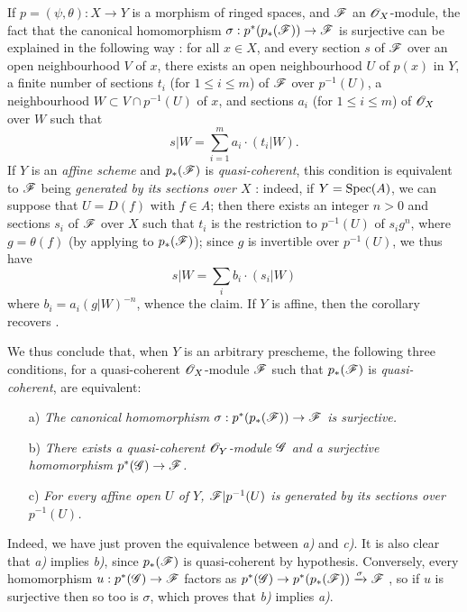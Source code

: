 \begin{remarks}[3.4.7]
\label{II.3.4.7}
If $p=(\psi,\theta):X\to Y$ is a morphism of ringed spaces, and $\mathscr{F}$ an $\mathscr{O}_X$-module, the fact that the canonical homomorphism $\sigma:p^*(p_*(\sh{F}))\to\sh{F}$ is surjective can be explained in the following way : for all $x\in X$, and every section $s$ of $\mathscr{F}$ over an open neighbourhood $V$ of $x$, there exists an open neighbourhood $U$ of $p(x)$ in $Y$, a finite number of sections $t_i$ (for $1\leq i\leq m$) of $\mathscr{F}$ over $p^{-1}(U)$, a neighbourhood $W\subset V\cap p^{-1}(U)$ of $x$, and sections $a_i$ (for $1\leq i\leq m$) of $\mathscr{O}_X$ over $W$ such that
\[
  s|W = \sum_{i=1}^m a_i\cdot(t_i|W).
\]
If $Y$ is an \emph{affine scheme} and $p_*(\mathscr{F})$ is \emph{quasi-coherent}, this condition is equivalent to $\mathscr{F}$ being \emph{generated by its sections over $X$} : indeed, if $Y=\operatorname{Spec}(A)$, we can suppose that $U=D(f)$ with $f\in A$;
then there exists an integer $n>0$ and sections $s_i$ of $\mathscr{F}$ over $X$ such that $t_i$ is the restriction to $p^{-1}(U)$ of $s_ig^n$, where $g=\theta(f)$ (by applying  to $p_*(\mathscr{F})$);
since $g$ is invertible over $p^{-1}(U)$, we thus have
\[
  s|W = \sum_i b_i\cdot(s_i|W)
\]
where $b_i=a_i(g|W)^{-n}$, whence the claim.
If $Y$ is affine, then the corollary  recovers .

We thus conclude that, when $Y$ is an arbitrary prescheme, the following three conditions, for a quasi-coherent $\mathscr{O}_X$-module $\mathscr{F}$ such that $p_*(\mathscr{F})$ is \emph{quasi-coherent}, are equivalent:
\begin{enumerate}
  \item[a)] \emph{The canonical homomorphism $\sigma:p^*(p_*(\sh{F}))\to\sh{F}$ is surjective.}
  \item[b)] \emph{There exists a quasi-coherent $\mathscr{O}_Y$-module $\mathscr{G}$ and a surjective homomorphism $p^*(\sh{G})\to\sh{F}$.}
  \item[c)] \emph{For every affine open $U$ of $Y$, $\mathscr{F}|p^{-1}(U)$ is generated by its sections over $p^{-1}(U)$.}
\end{enumerate}

Indeed, we have just proven the equivalence between \emph{a)} and \emph{c)}.
It is also clear that \emph{a)} implies \emph{b)}, since $p_*(\mathscr{F})$ is quasi-coherent by hypothesis.
Conversely, every homomorphism $u:p^*(\sh{G})\to\sh{F}$ factors as $p^*(\sh{G})\to p^*(p_*(\sh{F}))\xrightarrow{\sigma}\sh{F}$ , so if $u$ is surjective then so too is $\sigma$, which proves that \emph{b)} implies \emph{a)}.
\end{remarks}

